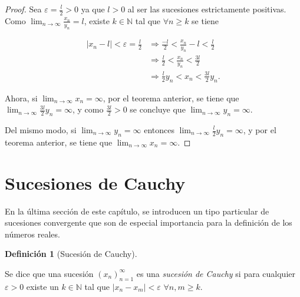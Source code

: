 \documentclass[
  a4paper,
]{scrreport}
\theoremstyle{definition}
\theoremstyle{plain}
\theoremstyle{definition}
\newtheorem{definition}{Definición}[chapter]
\theoremstyle{plain}
\theoremstyle{plain}
\theoremstyle{remark}
\begin{document}
\begin{tcolorbox}[enhanced jigsaw, breakable, arc=.35mm, colbacktitle=quarto-callout-note-color!10!white, toptitle=1mm, opacityback=0, colframe=quarto-callout-note-color-frame, colback=white, left=2mm, bottomrule=.15mm, opacitybacktitle=0.6, title=\textcolor{quarto-callout-note-color}{\faInfo}\hspace{0.5em}{Demostración}, toprule=.15mm, titlerule=0mm, coltitle=black, rightrule=.15mm, bottomtitle=1mm, leftrule=.75mm]

\begin{proof}

Sea \(\varepsilon=\frac{l}{2}>0\) ya que \(l>0\) al ser las sucesiones
estrictamente positivas. Como \(\lim_{n\to\infty} \frac{x_n}{y_n}=l\),
existe \(k\in\mathbb{N}\) tal que \(\forall n\geq k\) se tiene

\begin{align*}
|x_n-l|<\varepsilon=\frac{l}{2} &\Rightarrow \frac{-l}{2}<\frac{x_n}{y_n}-l<\frac{l}{2}\\ 
&\Rightarrow \frac{l}{2}<\frac{x_n}{y_n}< \frac{3l}{2}\\ 
&\Rightarrow \frac{l}{2}y_n<x_n<\frac{3l}{2}y_n.
\end{align*}

Ahora, si \(\lim_{n\to\infty}x_n=\infty\), por el teorema anterior, se
tiene que \(\lim_{n\to\infty}\frac{3l}{2}y_n=\infty\), y como
\(\frac{3l}{2}>0\) se concluye que \(\lim_{n\to\infty}y_n=\infty\).

Del mismo modo, si \(\lim_{n\to\infty}y_n=\infty\) entonces
\(\lim_{n\to\infty}\frac{l}{2}y_n=\infty\), y por el teorema anterior,
se tiene que \(\lim_{n\to\infty}x_n=\infty\).

\end{proof}

\end{tcolorbox}

\hypertarget{sucesiones-de-cauchy}{%
\section{Sucesiones de Cauchy}\label{sucesiones-de-cauchy}}

En la última sección de este capítulo, se introducen un tipo particular
de sucesiones convergente que son de especial importancia para la
definición de los números reales.

\leavevmode{}%
\begin{definition}[Sucesión de Cauchy]\label{def-sucesion-cauchy}

Se dice que una sucesión \((x_n)_{n=1}^\infty\) es una \emph{sucesión de
Cauchy} si para cualquier \(\varepsilon>0\) existe un \(k\in\mathbb{N}\)
tal que \(|x_n-x_m|<\varepsilon\) \(\forall n,m\geq k\).

\end{definition}
\end{document}
